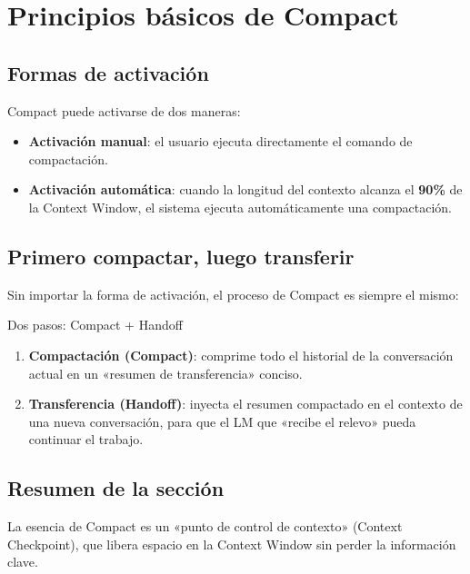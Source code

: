 \section{Principios básicos de Compact}

\subsection{Formas de activación}

Compact puede activarse de dos maneras:

\begin{itemize}
    \item \textbf{Activación manual}: el usuario ejecuta directamente el comando de compactación.
    \item \textbf{Activación automática}: cuando la longitud del contexto alcanza el \textbf{90\%} de la Context Window, el sistema ejecuta automáticamente una compactación.
\end{itemize}

\subsection{Primero compactar, luego transferir}

Sin importar la forma de activación, el proceso de Compact es siempre el mismo:

\begin{importantbox}{Dos pasos: Compact + Handoff}
\begin{enumerate}
    \item \textbf{Compactación (Compact)}: comprime todo el historial de la conversación actual en un «resumen de transferencia» conciso.
    \item \textbf{Transferencia (Handoff)}: inyecta el resumen compactado en el contexto de una nueva conversación, para que el LM que «recibe el relevo» pueda continuar el trabajo.
\end{enumerate}
\end{importantbox}

\subsection{Resumen de la sección}

La esencia de Compact es un «punto de control de contexto» (Context Checkpoint), que libera espacio en la Context Window sin perder la información clave.


